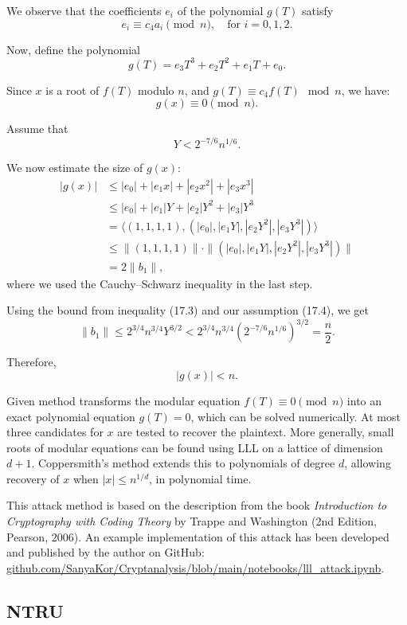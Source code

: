 \documentclass[a4paper,12pt]{article}
\begin{document}
We observe that the coefficients \( e_i \) of the polynomial \( g(T) \) satisfy
\[
e_i \equiv c_4 a_i \pmod{n}, \quad \text{for } i = 0, 1, 2.
\]

Now, define the polynomial
\[
g(T) = e_3 T^3 + e_2 T^2 + e_1 T + e_0.
\]

Since \( x \) is a root of \( f(T) \) modulo \( n \), and \( g(T) \equiv c_4 f(T) \mod n \), we have:
\[
g(x) \equiv 0 \pmod{n}.
\]

Assume that
\[
Y < 2^{-7/6} n^{1/6}. \tag{17.4}
\]

We now estimate the size of \( g(x) \):
\[
\begin{aligned}
|g(x)| &\leq |e_0| + |e_1 x| + |e_2 x^2| + |e_3 x^3| \\
       &\leq |e_0| + |e_1|Y + |e_2|Y^2 + |e_3|Y^3 \\
       &= \langle (1, 1, 1, 1), (|e_0|, |e_1 Y|, |e_2 Y^2|, |e_3 Y^3|) \rangle \\
       &\leq \|(1,1,1,1)\| \cdot \|(|e_0|, |e_1 Y|, |e_2 Y^2|, |e_3 Y^3|)\| \\
       &= 2 \|b_1\|,
\end{aligned}
\]
where we used the Cauchy–Schwarz inequality in the last step.

Using the bound from inequality (17.3) and our assumption (17.4), we get
\[
\|b_1\| \leq 2^{3/4} n^{3/4} Y^{3/2} < 2^{3/4} n^{3/4} \left(2^{-7/6} n^{1/6}\right)^{3/2} = \frac{n}{2}.
\]

Therefore,
\[
|g(x)| < n.
\]

Given method transforms the modular equation \( f(T) \equiv 0 \pmod{n} \) into an exact polynomial equation \( g(T) = 0 \), which can be solved numerically. At most three candidates for \( x \) are tested to recover the plaintext. More generally, small roots of modular equations can be found using LLL on a lattice of dimension \( d+1 \). Coppersmith's method extends this to polynomials of degree \( d \), allowing recovery of \( x \) when \( |x| \leq n^{1/d} \), in polynomial time.


 This attack method is based on the description from the book \textit{Introduction to Cryptography with Coding Theory} by Trappe and Washington (2nd Edition, Pearson, 2006). An example implementation of this attack has been developed and published by the author on GitHub: \href{https://github.com/SanyaKor/Cryptanalysis/blob/main/notebooks/lll\_attack.ipynb}{github.com/SanyaKor/Cryptanalysis/blob/main/notebooks/lll\_attack.ipynb}.
\newpage

\subsection{NTRU}
\end{document}
